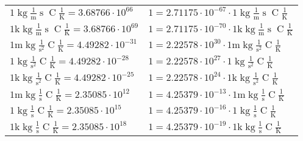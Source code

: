 \begin{center}
\begin{longtable}{l l}
{\color{black}$1 \bm{\mathrm{ }}\operatorname{kg}\frac1{\operatorname{m}}{\operatorname{s}}{\operatorname{C}}\frac1{\operatorname{K}} = 3.68766\cdot10^{66} $}   & {\color{black}$ 1 = 2.71175\cdot10^{-67} \cdot 1 \bm{\mathrm{ }}\operatorname{kg}\frac1{\operatorname{m}}{\operatorname{s}}{\operatorname{C}}\frac1{\operatorname{K}}$}  \\
{\color{gray}$1 \bm{\mathrm{ k}}\operatorname{kg}\frac1{\operatorname{m}}{\operatorname{s}}{\operatorname{C}}\frac1{\operatorname{K}} = 3.68766\cdot10^{69} $}   & {\color{gray}$ 1 = 2.71175\cdot10^{-70} \cdot 1 \bm{\mathrm{ k}}\operatorname{kg}\frac1{\operatorname{m}}{\operatorname{s}}{\operatorname{C}}\frac1{\operatorname{K}}$}  \\
{\color{gray}$1 \bm{\mathrm{ m}}\operatorname{kg}{}\frac1{\operatorname{s}^2}{\operatorname{C}}\frac1{\operatorname{K}} = 4.49282\cdot10^{-31} $}   & {\color{gray}$ 1 = 2.22578\cdot10^{30} \cdot 1 \bm{\mathrm{ m}}\operatorname{kg}{}\frac1{\operatorname{s}^2}{\operatorname{C}}\frac1{\operatorname{K}}$}  \\
{\color{black}$1 \bm{\mathrm{ }}\operatorname{kg}{}\frac1{\operatorname{s}^2}{\operatorname{C}}\frac1{\operatorname{K}} = 4.49282\cdot10^{-28} $}   & {\color{black}$ 1 = 2.22578\cdot10^{27} \cdot 1 \bm{\mathrm{ }}\operatorname{kg}{}\frac1{\operatorname{s}^2}{\operatorname{C}}\frac1{\operatorname{K}}$}  \\
{\color{gray}$1 \bm{\mathrm{ k}}\operatorname{kg}{}\frac1{\operatorname{s}^2}{\operatorname{C}}\frac1{\operatorname{K}} = 4.49282\cdot10^{-25} $}   & {\color{gray}$ 1 = 2.22578\cdot10^{24} \cdot 1 \bm{\mathrm{ k}}\operatorname{kg}{}\frac1{\operatorname{s}^2}{\operatorname{C}}\frac1{\operatorname{K}}$}  \\
{\color{gray}$1 \bm{\mathrm{ m}}\operatorname{kg}{}\frac1{\operatorname{s}}{\operatorname{C}}\frac1{\operatorname{K}} = 2.35085\cdot10^{12} $}   & {\color{gray}$ 1 = 4.25379\cdot10^{-13} \cdot 1 \bm{\mathrm{ m}}\operatorname{kg}{}\frac1{\operatorname{s}}{\operatorname{C}}\frac1{\operatorname{K}}$}  \\
{\color{black}$1 \bm{\mathrm{ }}\operatorname{kg}{}\frac1{\operatorname{s}}{\operatorname{C}}\frac1{\operatorname{K}} = 2.35085\cdot10^{15} $}   & {\color{black}$ 1 = 4.25379\cdot10^{-16} \cdot 1 \bm{\mathrm{ }}\operatorname{kg}{}\frac1{\operatorname{s}}{\operatorname{C}}\frac1{\operatorname{K}}$}  \\
{\color{gray}$1 \bm{\mathrm{ k}}\operatorname{kg}{}\frac1{\operatorname{s}}{\operatorname{C}}\frac1{\operatorname{K}} = 2.35085\cdot10^{18} $}   & {\color{gray}$ 1 = 4.25379\cdot10^{-19} \cdot 1 \bm{\mathrm{ k}}\operatorname{kg}{}\frac1{\operatorname{s}}{\operatorname{C}}\frac1{\operatorname{K}}$}  \\

\end{longtable}
\end{center}
